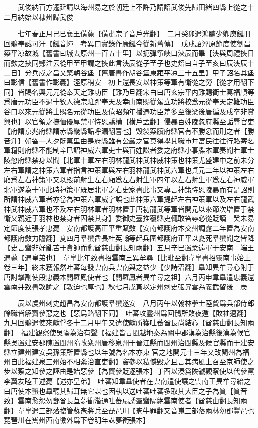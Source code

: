 　　武俊納百方遷延請以海州易之於朝廷上不許乃請詔武俊先歸田緒四縣上從之十二月納始以棣州歸武俊

　　七年春正月己巳襄王僙薨【僙肅宗子音戶光翻】　二月癸卯遣鴻臚少卿庾鋋冊回鶻奉誠可汗【鋋音蟬　考異曰實錄作康鋋今從新舊傳】　戊戍詔涇原節度使劉昌築平凉故城【舊書曰城去原州一百五十里】以扼彈筝峽口浹辰而畢【浹與周禮挾日而歛之挾同鄭注云從甲至甲謂之挾此言浹辰從子至子也史炤曰自子至亥曰辰浹辰十二日】分兵戍之昌又築朝谷堡【舊唐書作胡谷堡東距平凉三十五里】甲子詔名其堡曰彰信【舊書作彰義】涇原稍安　初上還長安以神策等軍有衛從之勞【從才用翻下同】皆賜名興元元從奉天定難功臣【難乃旦翻宋白曰唐玄宗平内難賜衛士葛福順等爲唐元功臣不過十數人德宗駐蹕奉天及幸山南賜從駕立功將校爲元從奉天定難功臣谷口以來元從將士賜名元從功臣及僖昭頻年播遷功臣差多至後梁後唐徧及戍卒非賞興也】以官領之撫恤優厚禁軍恃恩驕横【横戶孟翻】侵暴百姓陵忽府縣至詬辱官吏【府謂京兆府縣謂赤縣畿縣詬呼漏翻詈也】毁裂案牘府縣官有不勝忿而刑之者【勝音升】朝笞一人夕貶萬里由是府縣雖有公嚴之官莫得舉其職市井富民往往行賂寄名軍籍則府縣不能制辛巳詔神威六軍吏士與百姓訟者委之府縣小事牒本軍奏聞若軍士陵忽府縣禁身以聞【北軍十軍左右羽林龍武神武神威神策也神策尤盛建中之前未分左右軍謂之神策六軍者指言神策軍與左右羽林龍武神武六軍也貞元二年以神策左右廂爲左右神策軍又以殿前射生左右廂爲左右射生軍四年以左右射生軍爲左右神威軍北軍遂為十軍此時神策軍既居北軍之右史家書此事又專言神策恃恩陵暴而有是詔則所謂神威六軍者亦當為神策六軍威字誤也此神策六軍提起左右神策軍以及左右龍武神武神威六軍也不及左右羽林軍者羽林置于唐初龍武等軍皆開元以來節次增置于禁衛又親近于羽林也禁身者囚禁其身】委御史臺推覆縣吏輒敢笞辱必從貶謫　癸未易定節度使張孝忠薨　安南都護高正平重賦斂【安南都護府本交州調露二年置為安南都護府斂力贍翻】夏四月羣蠻酋長杜英翰等起兵圍都護府正平以憂死羣蠻聞之皆降【史言蠻非好亂苦于貪帥而亂酋慈由翻長知兩翻】五月辛巳置柔遠軍于安南　端王遇薨【遇皇弟也】　韋臯比年致書招雲南王異牟尋【比毗至翻韋臯書招靈南事始上卷三年】終未獲報然吐蕃每發雲南兵雲南與之益少【少詩沼翻】臯知異牟尋心附于唐討擊副使段忠義本閤羅鳳使者也【閤羅鳳者異牟尋之祖】六月丙申韋臯遣忠義還雲南并致書敦諭之【敦迫也厚也】秋七月戊寅以定州刺史張昇雲為義武留後　庚

　　辰以䖍州刺史趙昌為安南都護羣蠻遂安　八月丙午以翰林學士陸贄爲兵部侍郎餘職皆解竇參惡之也【惡烏路翻下同】　吐蕃攻靈州爲回鶻所敗夜遁【敗袖邁翻】九月回鶻遣使來獻俘冬十二月甲午又遣使獻所獲吐蕃酋長尚結心【酋慈由翻長知兩翻】　福建觀察使吳湊為治有聲【福建皆古閩越地秦為關中郡漢為治縣後漢為候官縣吳置建安郡陳置閩州隋改衆州唐移泉州于晉江縣而閩州治閩縣及候官縣而于建安縣立建州建安吳孫策所置縣也以年號為名本亦東官之地開元十三年又改閩州為福州自此福建泉三州始不相紊治直吏翻】竇參以私憾毁之且言其病風上召至京師使之步以察之知參之誣由是始惡參【為竇參貶逐張本】丁酉以湊爲陜虢觀察使以代參黨李翼友睦王述薨【述亦皇弟】　吐蕃知韋臯使者在雲南遣使讓之雲南王異牟尋紿之曰唐使本蠻也臯聽其歸耳無它謀也因執以送吐蕃吐蕃多取其大臣之子為質【質音致】雲南愈怨勿鄧酋長苴夢衝濳通吐蕃扇誘羣蠻隔絶雲南使者【酋慈由翻長知兩翻】韋臯遣三部落揔管蘇峞將兵至琵琶川【峞牛罪翻又音嵬三部落兩林勿鄧豐琶也琵琶川在嶲州西南徼外爲下卷明年誅夢衝張本】

